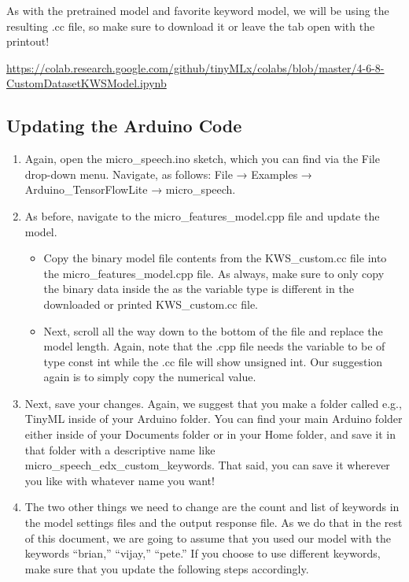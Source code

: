  As with the pretrained model and favorite keyword model, we will be using the resulting .cc file, so make sure to download it or leave the tab open with the printout!
    
    \url{https://colab.research.google.com/github/tinyMLx/colabs/blob/master/4-6-8-CustomDatasetKWSModel.ipynb}
    
\subsection{Updating the Arduino Code}

\begin{enumerate}
  \item Again, open the micro\_speech.ino sketch, which you can find via the File drop-down menu. Navigate, as follows: File → Examples → Arduino\_TensorFlowLite →   micro\_speech.
  
  \item As before, navigate to the micro\_features\_model.cpp file and update the model.
    \begin{itemize}
      \item Copy the binary model file contents from the KWS\_custom.cc file into the micro\_features\_model.cpp file. As always, make sure to only copy the binary data inside the { } as the variable type is different in the downloaded or printed KWS\_custom.cc file.
      \item Next, scroll all the way down to the bottom of the file and replace the model length. Again, note that the .cpp file needs the variable to be of type const int while the .cc file will show unsigned int. Our suggestion again is to simply copy the numerical value.
    \end{itemize}
  \item Next, save your changes. Again, we suggest that you make a folder called e.g., TinyML inside of your Arduino folder. You can find your main Arduino folder either inside of your Documents folder or in your Home folder, and save it in that folder with a descriptive name like micro\_speech\_edx\_custom\_keywords. That said, you can save it wherever you like with whatever name you want!
 
  \item  The two other things we need to change are the count and list of keywords in the model settings files and the output response file. As we do that in the rest of   this document, we are going to assume that you used our model with the keywords “brian,” “vijay,” “pete.” If you choose to use different keywords, make sure   that you update the following steps accordingly.


\end{enumerate}
